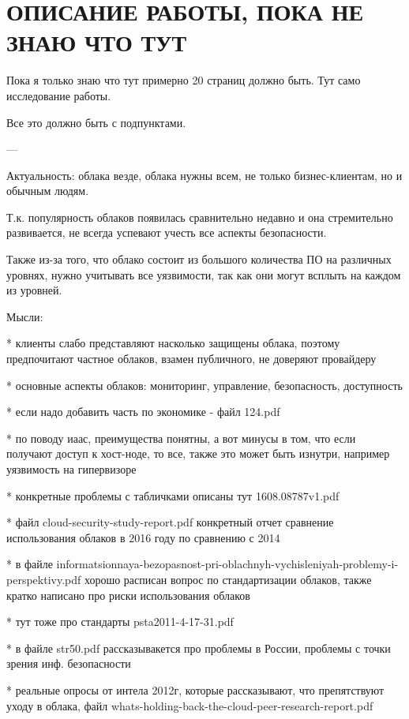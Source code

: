 \section{ОПИСАНИЕ РАБОТЫ, ПОКА НЕ ЗНАЮ ЧТО ТУТ}

Пока я только знаю что тут примерно 20 страниц должно быть. Тут само исследование работы.

Все это должно быть с подпунктами.


---

Актуальность: облака везде, облака нужны всем, не только бизнес-клиентам, но и обычным людям.

Т.к. популярность облаков появилась сравнительно недавно и она стремительно развивается, не всегда успевают учесть все аспекты безопасности.

Также из-за того, что облако состоит из большого количества ПО на различных уровнях, нужно учитывать все уязвимости, так как они могут всплыть на каждом из уровней.

Мысли:

* клиенты слабо представляют насколько защищены облака, поэтому предпочитают частное облаков, взамен публичного, не доверяют провайдеру

* основные аспекты облаков: мониторинг, управление, безопасность, доступность

* если надо добавить часть по экономике - файл 124.pdf

* по поводу иаас, преимущества понятны, а вот минусы в том, что если получают доступ к хост-ноде, то все, также это может быть изнутри, например уязвимость на гипервизоре

* конкретные проблемы с табличками описаны тут 1608.08787v1.pdf

* файл cloud-security-study-report.pdf конкретный отчет сравнение использования облаков в 2016 году по сравнению с 2014

* в файле informatsionnaya-bezopasnost-pri-oblachnyh-vychisleniyah-problemy-i-perspektivy.pdf хорошо расписан вопрос по стандартизации облаков, также кратко написано про риски использования облаков

* тут тоже про стандарты psta2011-4-17-31.pdf

* в файле str50.pdf рассказывакется про проблемы в России, проблемы с точки зрения инф. безопасности

* реальные опросы от интела 2012г, которые рассказывают, что препятствуют уходу в облака, файл whats-holding-back-the-cloud-peer-research-report.pdf

